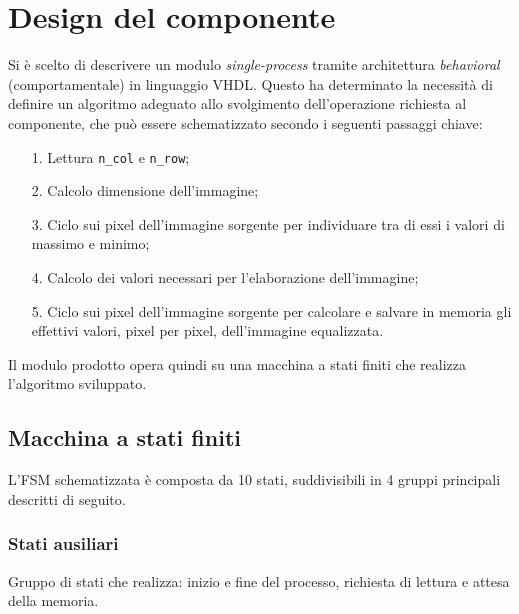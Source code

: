 \documentclass{article}
\begin{document}
\section{Design del componente} %
Si è scelto di descrivere un modulo \emph{single-process} tramite architettura \emph{behavioral} (comportamentale) in linguaggio VHDL.
Questo ha determinato la necessità di definire un algoritmo adeguato allo svolgimento dell’operazione richiesta al componente, che può essere schematizzato secondo i seguenti passaggi chiave:
\begin{itemize}
    \item   [1.]    Lettura \texttt{n\_col} e \texttt{n\_row};
    \item   [2.]    Calcolo dimensione dell'immagine;
    \item   [3.]    Ciclo sui pixel dell’immagine sorgente per individuare tra di essi i valori di massimo e minimo;
    \item   [4.]    Calcolo dei valori necessari per l’elaborazione dell’immagine;
    \item   [5.]    Ciclo sui pixel dell’immagine sorgente per calcolare e salvare in memoria gli effettivi valori, pixel per pixel, dell’immagine equalizzata.
\end{itemize}

Il modulo prodotto opera quindi su una macchina a stati finiti che realizza l'algoritmo sviluppato.
\vspace{0,2cm}

\subsection{Macchina a stati finiti} %
L’FSM schematizzata è composta da 10 stati, suddivisibili in 4 gruppi principali descritti di seguito.

\subsubsection{Stati ausiliari} %
Gruppo di stati che realizza: inizio e fine del processo, richiesta di lettura e attesa della memoria.
\end{document}
